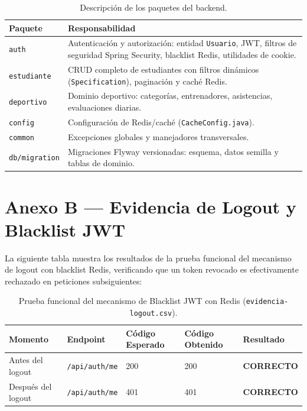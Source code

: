 \documentclass[12pt]{article}
\begin{document}
	\begin{table}[H]
		\centering
		\begin{tabular}{@{}p{3.5cm}p{9.5cm}@{}}
			\toprule
			\textbf{Paquete} & \textbf{Responsabilidad} \\ \midrule
			\texttt{auth} & Autenticación y autorización: entidad \texttt{Usuario}, JWT, filtros de seguridad Spring Security, blacklist Redis, utilidades de cookie. \\[4pt]
			\texttt{estudiante} & CRUD completo de estudiantes con filtros dinámicos (\texttt{Specification}), paginación y caché Redis. \\[4pt]
			\texttt{deportivo} & Dominio deportivo: categorías, entrenadores, asistencias, evaluaciones diarias. \\[4pt]
			\texttt{config} & Configuración de Redis/caché (\texttt{CacheConfig.java}). \\[4pt]
			\texttt{common} & Excepciones globales y manejadores transversales. \\[4pt]
			\texttt{db/migration} & Migraciones Flyway versionadas: esquema, datos semilla y tablas de dominio. \\
			\bottomrule
		\end{tabular}
		\caption{Descripción de los paquetes del backend.}
	\end{table}
	
	\newpage
	
	\section*{Anexo B — Evidencia de Logout y Blacklist JWT}
	
	La siguiente tabla muestra los resultados de la prueba funcional del mecanismo de logout con blacklist Redis, verificando que un token revocado es efectivamente rechazado en peticiones subsiguientes:
	
	\begin{table}[H]
		\centering
		\begin{tabular}{@{}lllll@{}}
			\toprule
			\textbf{Momento} & \textbf{Endpoint} & \textbf{Código Esperado} & \textbf{Código Obtenido} & \textbf{Resultado} \\ \midrule
			Antes del logout & \texttt{/api/auth/me} & 200 & 200 & \textcolor{codegreen}{\textbf{CORRECTO}} \\
			Después del logout & \texttt{/api/auth/me} & 401 & 401 & \textcolor{codegreen}{\textbf{CORRECTO}} \\
			\bottomrule
		\end{tabular}
		\caption{Prueba funcional del mecanismo de Blacklist JWT con Redis (\texttt{evidencia-logout.csv}).}
	\end{table}
	
\end{document}
